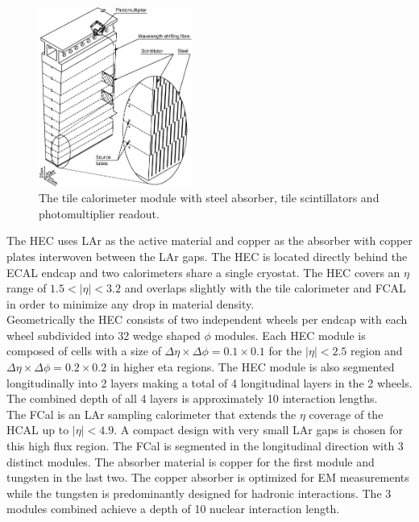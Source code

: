 \begin{figure}[h!]
\centering
\includegraphics[width=0.45\textwidth, angle=0]{figures/LHC_ATLAS/TileCal_Module3.eps}
\caption[~The tile calorimeter module with steel absorber, tile scintillators and photomultiplier readout]{ The tile calorimeter module with steel absorber, tile scintillators and photomultiplier readout.\cite{ATLAS_JINST} \label{LHC:fig:TileCalo}}
\end{figure}


\indent The HEC uses LAr as the active material and copper as the absorber with copper plates interwoven between the LAr gaps.  The HEC is located directly behind the ECAL endcap and two calorimeters share a single cryostat.  The HEC  covers an $\eta$ range of $1.5<|\eta| < 3.2$ and overlaps slightly with the tile calorimeter and FCAL in order to minimize any drop in material density.  \\

\indent Geometrically the HEC consists of two independent wheels per endcap with each wheel subdivided into 32 wedge shaped $\phi$ modules.  Each HEC module is composed of cells with a size of $\Delta\eta \times \Delta\phi = 0.1 \times 0.1$ for the $|\eta|<2.5$ region and $\Delta\eta \times \Delta\phi = 0.2 \times 0.2$ in higher eta regions.  The HEC module is also segmented longitudinally into 2 layers making a total of 4 longitudinal layers in the 2 wheels. The combined depth of all 4 layers is approximately 10 interaction lengths. \\

\indent The FCal is an LAr sampling calorimeter that extends the $\eta$ coverage of the HCAL up to $|\eta| < 4.9$.  A compact design with very small LAr gaps is chosen for this high flux region.  The FCal is segmented in the longitudinal direction with 3 distinct modules. The absorber material is copper for the first module and tungsten in the last two.  The copper absorber is optimized for EM measurements while the tungsten is predominantly designed for hadronic interactions.  The 3 modules combined achieve a depth of 10 nuclear interaction length. \\

